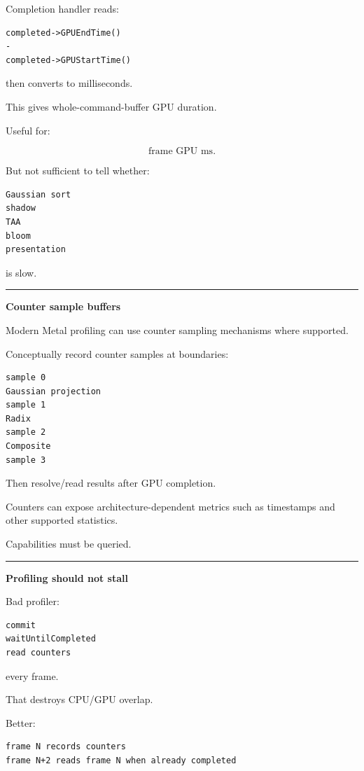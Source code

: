 Completion handler reads:

\begin{verbatim}
completed->GPUEndTime()
-
completed->GPUStartTime()
\end{verbatim}

then converts to milliseconds.

This gives whole-command-buffer GPU duration.

Useful for:

\[
\text{frame GPU ms}.
\]

But not sufficient to tell whether:

\begin{verbatim}
Gaussian sort
shadow
TAA
bloom
presentation
\end{verbatim}

is slow.

\begin{center}\rule{0.5\linewidth}{0.5pt}\end{center}

\textbf{Counter sample buffers}

Modern Metal profiling can use counter sampling mechanisms where supported.

Conceptually record counter samples at boundaries:

\begin{verbatim}
sample 0
Gaussian projection
sample 1
Radix
sample 2
Composite
sample 3
\end{verbatim}

Then resolve/read results after GPU completion.

Counters can expose architecture-dependent metrics such as timestamps and other supported statistics.

Capabilities must be queried.

\begin{center}\rule{0.5\linewidth}{0.5pt}\end{center}

\textbf{Profiling should not stall}

Bad profiler:

\begin{verbatim}
commit
waitUntilCompleted
read counters
\end{verbatim}

every frame.

That destroys CPU/GPU overlap.

Better:

\begin{verbatim}
frame N records counters
frame N+2 reads frame N when already completed
\end{verbatim}

